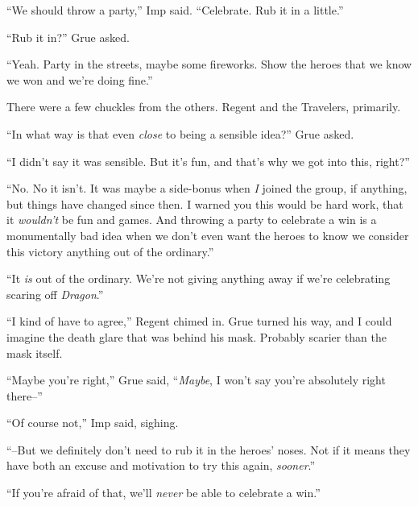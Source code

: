 





``We should throw a party,'' Imp said.  ``Celebrate.  Rub it in a little.''



``Rub it in?'' Grue asked.



``Yeah.  Party in the streets, maybe some fireworks.  Show the heroes that we know we won and we're doing fine.''



There were a few chuckles from the others.  Regent and the Travelers, primarily.



``In what way is that even \emph{close} to being a sensible idea?''  Grue asked.



``I didn't say it was sensible.  But it's fun, and that's why we got into this, right?''



``No.  No it isn't.  It was maybe a side-bonus when \emph{I} joined the group, if anything, but things have changed since then.  I warned you this would be hard work, that it \emph{wouldn't} be fun and games.  And throwing a party to celebrate a win is a monumentally bad idea when we don't even want the heroes to know we consider this victory anything out of the ordinary.''



``It \emph{is} out of the ordinary.  We're not giving anything away if we're celebrating scaring off \emph{Dragon}.''



``I kind of have to agree,'' Regent chimed in.  Grue turned his way, and I could imagine the death glare that was behind his mask.  Probably scarier than the mask itself.



``Maybe you're right,'' Grue said, ``\emph{Maybe}, I won't say you're absolutely right there--''



``Of course not,'' Imp said, sighing.



``--But we definitely don't need to rub it in the heroes' noses.  Not if it means they have both an excuse and motivation to try this again, \emph{sooner}.''



``If you're afraid of that, we'll \emph{never} be able to celebrate a win.''



